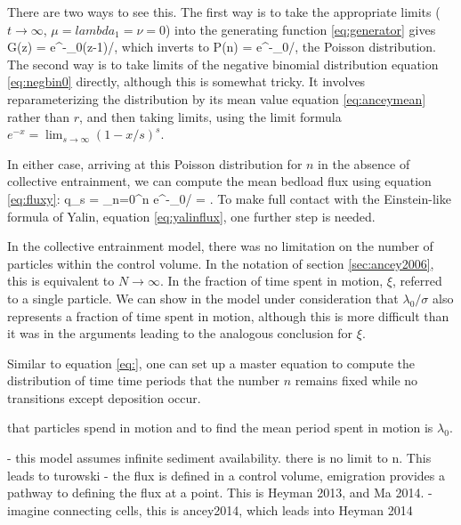 There are two ways to see this. 
The first way is to take the appropriate limits ($t \rightarrow \infty$, $\mu=lambda_1=\nu= 0$)  into the generating function \ref{eq:generator} gives 
\be G(z) = e^{-\lambda_0(z-1)/\sigma},\ee
which inverts to 
\be P(n) = e^{-\lambda_0/\sigma},\label{eq:anceypoisson}\ee
the Poisson distribution.  
The second way is to take limits of the negative binomial distribution equation \ref{eq:negbin0} directly, although this is somewhat tricky.
It involves reparameterizing the distribution by its mean value equation \ref{eq:anceymean} rather than $r$, and then taking limits, using the limit formula $e^{-x} = \lim_{s \rightarrow \infty} (1-x/s)^s$.

In either case, arriving at this Poisson distribution for $n$ in the absence of collective entrainment, we can compute the mean bedload flux using equation \ref{eq:fluxy}: 
\be \bra q_s \ket =  \sum_{n=0}^\infty n e^{-\lambda_0/\sigma} =  . \ee
To make full contact with the Einstein-like formula of Yalin, equation \ref{eq:yalinflux}, one further step is needed. 

In the \citet{Ancey2008} collective entrainment model, there was no limitation on the number of particles within the control volume. 
In the notation of section \ref{sec:ancey2006}, this is equivalent to $N \rightarrow \infty$. 
In \citet{Ancey2006} the fraction of time spent in motion, $\xi$, referred to a single particle. 
We can show in the model under consideration that $\lambda_0/\sigma$ also represents a fraction of time spent in motion, although this is more difficult than it was in the arguments leading to the analogous conclusion for $\xi$. 

Similar to equation \ref{eq:}, one can set up a master equation to compute the distribution of time time periods that the number $n$ remains fixed while no transitions except deposition occur. 


 that particles spend in motion and to find the mean period spent in motion is $\lambda_0$. 











- this model assumes infinite sediment availability. there is no limit to n. This leads to turowski
- the flux is defined in a control volume, emigration provides a pathway to defining the flux at a point. This is Heyman 2013, and Ma 2014. 
- imagine connecting cells, this is ancey2014, which leads into Heyman 2014




